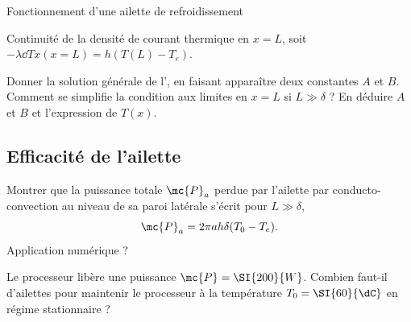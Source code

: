 \begin{exo}[PC][1][devoir]{Fonctionnement d'une ailette de refroidissement}
\begin{quest}
{ Continuité de la densité de courant thermique en $x=L$, soit $-\lambda \dd{T}{x}(x=L) = h(T(L)-T_e)$.
 }
 \item Donner la solution générale de l', en faisant apparaître deux constantes $A$ et $B$.
 Comment se simplifie la condition aux limites en $x=L$ si $L \gg \delta$ ? En déduire $A$ et $B$ et l'expression de $T(x)$.
\end{quest}

\subsection{Efficacité de l'ailette}

\begin{quest}
\item Montrer que la puissance totale $\mc{P}_a$ perdue par l'ailette par conducto-convection au niveau de sa paroi latérale s'écrit pour $L \gg \delta$,
\begin{equation}
  \mc{P}_a = 2\pi a h \delta (T_0-T_e).
\end{equation}
Application numérique ?
\item Le processeur libère une puissance $\mc{P}= \SI{200}{W}$. Combien faut-il d'ailettes pour maintenir le processeur à la température $T_0 = \SI{60}{\dC}$ en régime stationnaire ?
\end{quest}
\end{exo}



